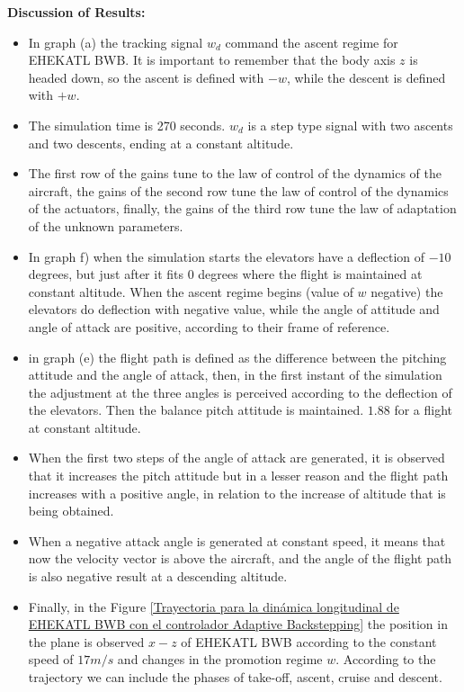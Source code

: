 \textbf{Discussion of Results:}
\begin{itemize}
    \item In graph (a) the tracking signal $w_d$ command the ascent regime for EHEKATL BWB. It is important to remember that the body axis $z$ is headed down, so the ascent is defined with $-w$, while the descent is defined with $+w$. 
    \item The simulation time is 270 seconds. $w_d$ is a step type signal with two ascents and two descents, ending at a constant altitude.
    \item The first row of the gains tune to the law of control of the dynamics of the aircraft, the gains of the second row tune the law of control of the dynamics of the actuators, finally, the gains of the third row tune the law of adaptation of the unknown parameters.
    \item In graph f) when the simulation starts the elevators have a deflection of $-10$ degrees, but just after it fits $0$ degrees where the flight is maintained at constant altitude. When the ascent regime begins (value of $w$ negative) the elevators do deflection with negative value, while the angle of attitude and angle of attack are positive, according to their frame of reference. 
    \item in graph (e) the flight path is defined as the difference between the pitching attitude and the angle of attack, then, in the first instant of the simulation the adjustment at the three angles is perceived according to the deflection of the elevators. Then the balance pitch attitude is maintained. $1.88$ for a flight at constant altitude. 
    \item When the first two steps of the angle of attack are generated, it is observed that it increases the pitch attitude but in a lesser reason and the flight path increases with a positive angle, in relation to the increase of altitude that is being obtained. 
    \item When a negative attack angle is generated at constant speed, it means that now the velocity vector is above the aircraft, and the angle of the flight path is also negative result at a descending altitude. 
    \item Finally, in the Figure \ref{Trayectoria para la dinámica longitudinal de EHEKATL BWB con el controlador Adaptive Backstepping} the position in the plane is observed $x-z$ of EHEKATL BWB according to the constant speed of $17 m/s$ and changes in the promotion regime $w$. According to the trajectory we can include the phases of take-off, ascent, cruise and descent. 
\end{itemize}

